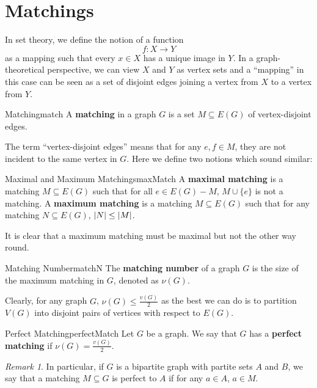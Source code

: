 \documentclass[math]{amznotes}
\theoremstyle{remark}
\newtheorem*{remark}{Remark}
\newcommand{\0}{\mathbf{0}}
\newcommand{\1}{\mathbf{1}}
\begin{document}
\section{Matchings}
In set theory, we define the notion of a function
\begin{equation*}
    f \colon X \to Y
\end{equation*}
as a mapping such that every $x \in X$ has a unique image in $Y$. In a graph-theoretical perspective, we can view $X$ and $Y$ as vertex sets and a ``mapping'' in this case can be seen as a set of disjoint edges joining a vertex from $X$ to a vertex from $Y$.
\begin{dfnbox}{Matching}{match}
    A {\color{red} \textbf{matching}} in a graph $G$ is a set $M \subseteq E(G)$ of vertex-disjoint edges.
\end{dfnbox}
The term ``vertex-disjoint edges'' means that for any $e, f \in M$, they are not incident to the same vertex in $G$. Here we define two notions which sound similar:
\begin{dfnbox}{Maximal and Maximum Matchings}{maxMatch}
    A {\color{red} \textbf{maximal matching}} is a matching $M \subseteq E(G)$ such that for all $e \in E(G) - M$, $M \cup \{e\}$ is not a matching. A {\color{red} \textbf{maximum matching}} is a matching $M \subseteq E(G)$ such that for any matching $N \subseteq E(G)$, ${\left\lvert {N} \right\rvert} \leq {\left\lvert {M} \right\rvert}$.
\end{dfnbox}
It is clear that a maximum matching must be maximal but not the other way round.
\begin{dfnbox}{Matching Number}{matchN}
    The {\color{red} \textbf{matching number}} of a graph $G$ is the size of the maximum matching in $G$, denoted as $\nu(G)$.
\end{dfnbox}
Clearly, for any graph $G$, $\nu(G) \leq \frac{v(G)}{2}$ as the best we can do is to partition $V(G)$ into disjoint pairs of vertices with respect to $E(G)$.
\begin{dfnbox}{Perfect Matching}{perfectMatch}
    Let $G$ be a graph. We say that $G$ has a {\color{red} \textbf{perfect matching}} if $\nu(G) = \frac{v(G)}{2}$.
\end{dfnbox}
\begin{notebox}
    \begin{remark}
        In particular, if $G$ is a bipartite graph with partite sets $A$ and $B$, we say that a matching $M \subseteq G$ is perfect to $A$ if for any $a \in A$, $a \in M$.
    \end{remark}
\end{notebox}
\end{document}
